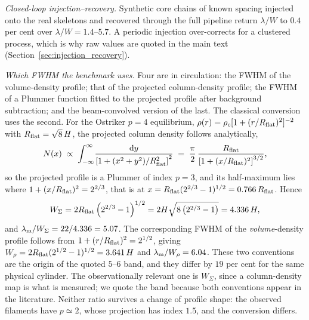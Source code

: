 \documentclass[usenatbib,twoside,twocolumn]{mnras}
\begin{document}
\emph{Closed-loop injection--recovery.} Synthetic core chains of known spacing injected onto the real skeletons and recovered through the full pipeline return $\lambda/W$ to $0.4$ per cent over $\lambda/W=1.4$--$5.7$. A periodic injection over-corrects for a clustered process, which is why raw values are quoted in the main text (Section~\ref{sec:injection_recovery}).

\emph{Which FWHM the benchmark uses.} Four are in circulation: the FWHM of the volume-density profile; that of the projected column-density profile; the FWHM of a Plummer function fitted to the projected profile after background subtraction; and the beam-convolved version of the last. The classical conversion uses the second. For the Ostriker $p=4$ equilibrium, $\rho(r)=\rho_c[1+(r/R_{\rm flat})^2]^{-2}$ with $R_{\rm flat}=\sqrt8\,H$, the projected column density follows analytically,
\begin{equation}
N(x)\;\propto\;\int_{-\infty}^{\infty}\!\frac{{\rm d}y}{\left[1+(x^2+y^2)/R_{\rm flat}^2\right]^{2}}\;=\;\frac{\pi}{2}\,\frac{R_{\rm flat}}{\left[1+(x/R_{\rm flat})^{2}\right]^{3/2}},
\label{eq:ostrikercol}
\end{equation}
so the projected profile is a Plummer of index $p=3$, and its half-maximum lies where $1+(x/R_{\rm flat})^{2}=2^{2/3}$, that is at $x=R_{\rm flat}(2^{2/3}-1)^{1/2}=0.766\,R_{\rm flat}$. Hence
\begin{equation}
W_{\Sigma}=2R_{\rm flat}\left(2^{2/3}-1\right)^{1/2}=2H\sqrt{8\left(2^{2/3}-1\right)}=4.336\,H,
\label{eq:wsigma}
\end{equation}
and $\lambda_{\rm m}/W_{\Sigma}=22/4.336=5.07$. The corresponding FWHM of the \emph{volume}-density profile follows from $1+(r/R_{\rm flat})^{2}=2^{1/2}$, giving $W_{\rho}=2R_{\rm flat}(2^{1/2}-1)^{1/2}=3.641\,H$ and $\lambda_{\rm m}/W_{\rho}=6.04$. These two conventions are the origin of the quoted $5$--$6$ band, and they differ by $19$ per cent for the same physical cylinder. The observationally relevant one is $W_{\Sigma}$, since a column-density map is what is measured; we quote the band because both conventions appear in the literature. Neither ratio survives a change of profile shape: the observed filaments have $p\simeq2$, whose projection has index $1.5$, and the conversion differs.
\end{document}
